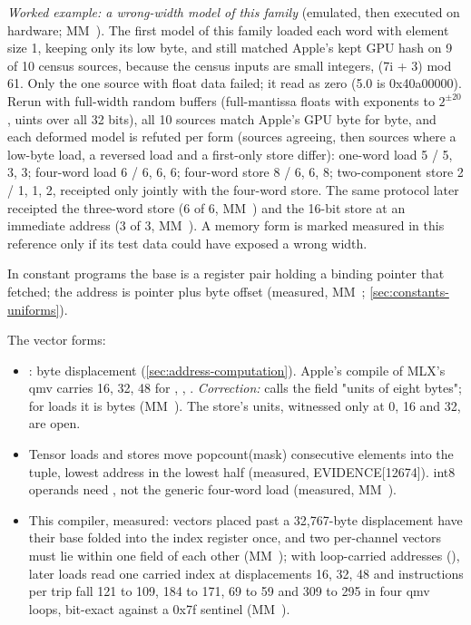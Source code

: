 \emph{Worked example: a wrong-width model of this family} (emulated, then executed on hardware; MM~). The first model of
this family loaded each word with element size 1, keeping only its low byte, and still matched Apple's kept GPU hash on
9 of 10 census sources, because the census inputs are small integers, (7i + 3) mod 61. Only the one source with
float data failed; it read as zero (5.0 is 0x40a00000). Rerun with full-width random buffers (full-mantissa floats with
exponents to $2^{\pm20}$, uints over all 32 bits), all 10 sources match Apple's GPU byte for byte, and each deformed model is
refuted per form (sources agreeing, then sources where a low-byte load, a reversed load and a first-only store differ):
one-word load 5 / 5, 3, 3; four-word load 6 / 6, 6, 6; four-word store 8 / 6, 6, 8; two-component store 2 / 1, 1, 2,
receipted only jointly with the four-word store. The same protocol later receipted the three-word store (6 of 6,
MM~) and the 16-bit store at an immediate address (3 of 3, MM~). A memory form is marked
measured in this reference only if its test data could have exposed a wrong width.

In constant programs the base is a register pair holding a binding pointer that  fetched; the address is pointer plus byte offset (measured, MM~; \cref{sec:constants-uniforms}).

The vector forms:

\begin{itemize}
\item {}: byte displacement (\cref{sec:address-computation}). Apple's compile of MLX's qmv carries 16, 32, 48 for
  , , . \emph{Correction:}  calls the field "units of eight bytes"; for loads it is
  bytes (MM~). The store's units, witnessed only at 0, 16 and 32, are open.
\item Tensor loads and stores move popcount(mask) consecutive elements into the tuple, lowest address in the lowest half
  (measured,  EVIDENCE{[}12674{]}). int8 operands need , not the
  generic four-word load (measured, MM~).
\item This compiler, measured: vectors placed past a 32,767-byte displacement have their base folded into the index
  register once, and two per-channel vectors must lie within one field of each other (MM~); with loop-carried
  addresses (), later loads read one carried index at displacements 16, 32, 48 and instructions per trip fall
  121 to 109, 184 to 171, 69 to 59 and 309 to 295 in four qmv loops, bit-exact against a 0x7f sentinel (MM~).
\end{itemize}

